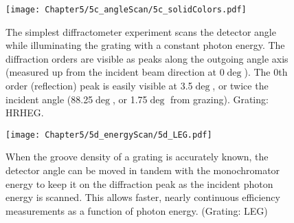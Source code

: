 \begin{figure}[htbp] %
   \centering
   \texttt{[image: Chapter5/5c\_angleScan/5c\_solidColors.pdf]} 
   \caption[The simplest diffractometer experiment scans the detector angle while illuminating the grating with a constant photon energy.]{The simplest diffractometer experiment scans the detector angle while illuminating the grating with a constant photon energy.  The diffraction orders are visible as peaks along the outgoing angle axis (measured up from the incident beam direction at 0$\deg$).  The 0th order (reflection) peak is easily visible at 3.5$\deg$, or twice the incident angle (88.25$\deg$, or 1.75$\deg$ from grazing).  Grating: HRHEG.}
   \label{5c}
\end{figure}

\begin{figure}[htbp] %
   \centering
   \texttt{[image: Chapter5/5d\_energyScan/5d\_LEG.pdf]} 
   \caption[When the groove density of a grating is accurately known, the detector angle can be moved in tandem with the monochromator energy to keep it on the diffraction peak as the incident photon energy is scanned.]{When the groove density of a grating is accurately known, the detector angle can be moved in tandem with the monochromator energy to keep it on the diffraction peak as the incident photon energy is scanned.  This allows faster, nearly continuous efficiency measurements as a function of photon energy.  (Grating: LEG)}
   \label{5d}
\end{figure}


